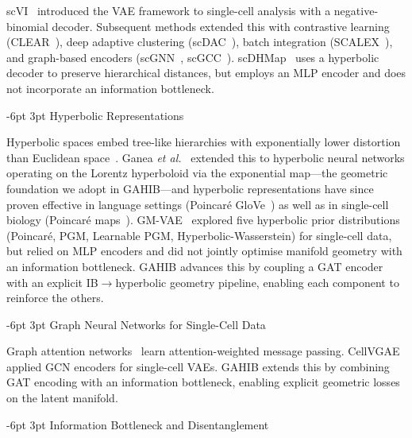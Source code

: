 \documentclass[preprint,12pt]{elsarticle}
\makeatletter
\renewcommand\subsection{\@startsection{subsection}{2}{\z@}%
  {-6pt \@plus -2pt \@minus -2pt}%
  {3pt \@plus 1pt \@minus 1pt}%
  {\normalfont\large\bfseries}}
\makeatother
\begin{document}
scVI~\cite{lopez2018deep} introduced the VAE framework to single-cell
analysis with a negative-binomial decoder.
Subsequent methods extended this with contrastive learning
(CLEAR~\cite{han2022clear}), deep adaptive clustering
(scDAC~\cite{an2024scdac}), batch integration
(SCALEX~\cite{xiong2022scalex}), and graph-based encoders
(scGNN~\cite{wang2021scgnn}, scGCC~\cite{tian2023scgcc}).
scDHMap~\cite{tian2023scdhmap} uses a hyperbolic decoder to preserve
hierarchical distances, but employs an MLP encoder and does not incorporate
an information bottleneck.

\subsection{Hyperbolic Representations}

Hyperbolic spaces embed tree-like hierarchies with exponentially lower
distortion than Euclidean space~\cite{nickel2017poincare}.
Ganea \emph{et al.}~\cite{ganea2018hyperbolic} extended this to hyperbolic
neural networks operating on the Lorentz hyperboloid via the exponential
map---the geometric foundation we adopt in GAHIB---and hyperbolic
representations have since proven effective in language settings
(Poincar\'e GloVe~\cite{tifrea2019poincareglove}) as well as in
single-cell biology (Poincar\'e maps~\cite{klimovskaia2020poincare}).
GM-VAE~\cite{bayer2023gmvae} explored five hyperbolic prior distributions
(Poincar\'e, PGM, Learnable PGM, Hyperbolic-Wasserstein) for single-cell
data, but relied on MLP encoders and did not jointly optimise manifold
geometry with an information bottleneck.
GAHIB advances this by coupling a GAT encoder with an explicit
IB$\to$hyperbolic geometry pipeline, enabling each component to reinforce
the others.

\subsection{Graph Neural Networks for Single-Cell Data}

Graph attention networks~\cite{velickovic2018graph} learn
attention-weighted message passing.
CellVGAE~\cite{buterez2022cellvgae} applied GCN encoders for single-cell
VAEs.
GAHIB extends this by combining GAT encoding with an information bottleneck,
enabling explicit geometric losses on the latent manifold.

\subsection{Information Bottleneck and Disentanglement}
\end{document}
